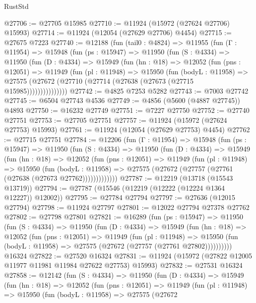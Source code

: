 \begin{lexlean}{RustStd}
\begin{coremodule}
{\begin{coremodule}
{{{{{{{{{{{{{{{{{{{{{{{{{{{{{{{{{{{{{{{{{{{{{{{{{{{{{{{{{{{{{{{{{{{{{{{{{{{{{{{{@27706 := @27705 @15985
@27710 := @11924 (@15972 (@27624 @27706) @15993)
@27714 := @11924 (@12054 (@27629 @27706) @4454)
@27715 := @27675 @7223
@27740 := @12188
    (fun (tail0 : @4824) =>
    @11955
      (fun (Γ : @11954) =>
      @15948
        (fun (ps : @15947) =>
        @11950
          (fun (S : @4334) =>
          @11950
            (fun (D : @4334) =>
            @15949
              (fun (hn : @18) =>
              @12052
                (fun (pns : @12051) =>
                @11949
                  (fun (pl : @11948) =>
                  @15950
                    (fun (bodyL : @11958) =>
                    @27575 (@27672 (@27710 (@27714 (@27638 (@27673 (@27715 @15985)))))))))))))))
@27742 := @4825 @7253 @5282
@27743 := @7003 @27742
@27745 := @6504 @27743 @4536
@27749 := @4856 (@5600 (@4887 @27745)) @4893
@27750 := @16232 @27749
@27751 := @7227 @27750
@27752 := @27740 @27751
@27753 := @27705 @27751
@27757 := @11924 (@15972 (@27624 @27753) @15993)
@27761 := @11924 (@12054 (@27629 @27753) @4454)
@27762 := @27715 @27751
@27784 := @12206
    (fun (Γ : @11954) =>
    @15948
      (fun (ps : @15947) =>
      @11950
        (fun (S : @4334) =>
        @11950
          (fun (D : @4334) =>
          @15949
            (fun (hn : @18) =>
            @12052
              (fun (pns : @12051) =>
              @11949
                (fun (pl : @11948) =>
                @15950
                  (fun (bodyL : @11958) =>
                  @27575 (@27672 (@27757 (@27761 (@27638 (@27673 @27762)))))))))))))
@27787 := @12219 (@13718 (@15543 @13719))
@27794 := @27787 (@15546 (@12219 (@12222 (@12224 @1364 @12227)) @12002))
@27795 := @27784 @27794
@27797 := @27636 (@12015 @27794)
@27798 := @11924 @27797
@27801 := @12022 @27794 @27378 @27762
@27802 := @27798 @27801
@27821 := @16289
    (fun (ps : @15947) =>
    @11950
      (fun (S : @4334) =>
      @11950
        (fun (D : @4334) =>
        @15949
          (fun (hn : @18) =>
          @12052
            (fun (pns : @12051) =>
            @11949
              (fun (pl : @11948) =>
              @15950 (fun (bodyL : @11958) => @27575 (@27672 (@27757 (@27761 @27802))))))))))
    @16324
@27822 := @27520 @16324
@27831 := @11924 (@15972 (@27822 @12005 @11977 @11981 @11984 @27622 @27753) @15993)
@27832 := @27531 @16324
@27858 := @12142
    (fun (S : @4334) =>
    @11950
      (fun (D : @4334) =>
      @15949
        (fun (hn : @18) =>
        @12052
          (fun (pns : @12051) =>
          @11949
            (fun (pl : @11948) =>
            @15950
              (fun (bodyL : @11958) =>
              @27575
                (@27672
}}}}}}}}}}}}}}}}}}}}}}}}}}}}}}}}}}}}}}}}}}}}}}}}}}}}}}}}}}}}}}}}}}}}}}}}}}}}}}}}
\end{coremodule}}
\end{coremodule}
\end{lexlean}
